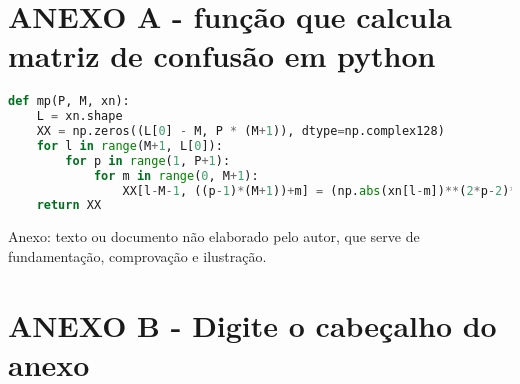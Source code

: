 \chapter*{\normalsize ANEXO A - função que calcula matriz de confusão em python}
\small %
\begin{lstlisting}[language = Python, label={lst:mp}]
def mp(P, M, xn):
    L = xn.shape
    XX = np.zeros((L[0] - M, P * (M+1)), dtype=np.complex128)
    for l in range(M+1, L[0]):
        for p in range(1, P+1):
            for m in range(0, M+1):
                XX[l-M-1, ((p-1)*(M+1))+m] = (np.abs(xn[l-m])**(2*p-2)*(xn[l-m]))[0]
    return XX
\end{lstlisting}
Anexo: texto ou documento não elaborado pelo autor, que serve de fundamentação, comprovação e ilustração.

\chapter*{\normalsize ANEXO B - Digite o cabeçalho do anexo}